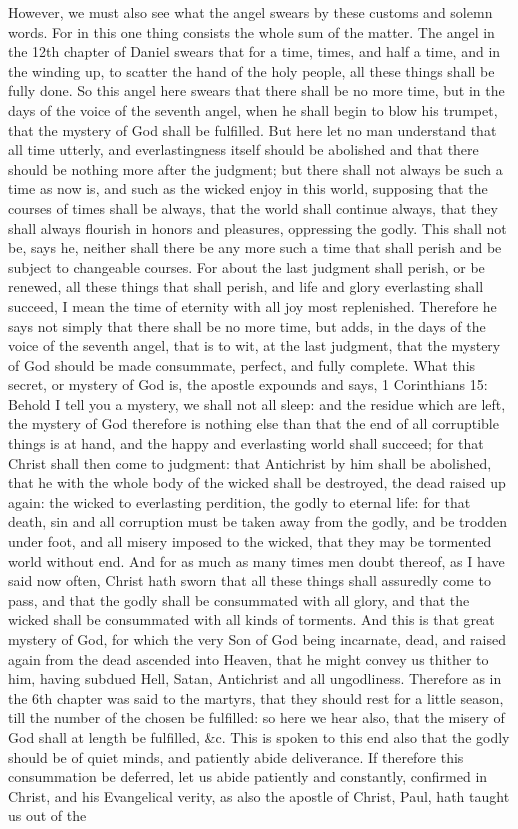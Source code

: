 However, we must also see what the angel swears by these customs and solemn words. For in this one thing consists the whole sum of the matter. The angel in the 12th chapter of Daniel swears that for a time, times, and half a time, and in the winding up, to scatter the hand of the holy people, all these things shall be fully done. So this angel here swears that there shall be no more time, but in the days of the voice of the seventh angel, when he shall begin to blow his trumpet, that the mystery of God shall be fulfilled. But here let no man understand that all time utterly, and everlastingness itself should be abolished and that there should be nothing more after the judgment; but there shall not always be such a time as now is, and such as the wicked enjoy in this world, supposing that the courses of times shall be always, that the world shall continue always, that they shall always flourish in honors and pleasures, oppressing the godly. This shall not be, says he, neither shall there be any more such a time that shall perish and be subject to changeable courses. For about the last judgment shall perish, or be renewed, all these things that shall perish, and life and glory everlasting shall succeed, I mean the time of eternity with all joy most replenished. Therefore he says not simply that there shall be no more time, but adds, in the days of the voice of the seventh angel, that is to wit, at the last judgment, that the mystery of God should be made consummate, perfect, and fully complete. What this secret, or mystery of God is, the apostle expounds and says, 1 Corinthians 15: Behold I tell you a mystery, we shall not all sleep: and the residue which are left, the mystery of God therefore is nothing else than that the end of all corruptible things is at hand, and the happy and everlasting world shall succeed; for that Christ shall then come to judgment: that Antichrist by him shall be abolished, that he with the whole body of the wicked shall be destroyed, the dead raised up again: the wicked to everlasting perdition, the godly to eternal life: for that death, sin and all corruption must be taken away from the godly, and be trodden under foot, and all misery imposed to the wicked, that they may be tormented world without end. And for as much as many times men doubt thereof, as I have said now often, Christ hath sworn that all these things shall assuredly come to pass, and that the godly shall be consummated with all glory, and that the wicked shall be consummated with all kinds of torments. And this is that great mystery of God, for which the very Son of God being incarnate, dead, and raised again from the dead ascended into Heaven, that he might convey us thither to him, having subdued Hell, Satan, Antichrist and all ungodliness. Therefore as in the 6th chapter was said to the martyrs, that they should rest for a little season, till the number of the chosen be fulfilled: so here we hear also, that the misery of God shall at length be fulfilled, \&c. This is spoken to this end also that the godly should be of quiet minds, and patiently abide deliverance. If therefore this consummation be deferred, let us abide patiently and constantly, confirmed in Christ, and his Evangelical verity, as also the apostle of Christ, Paul, hath taught us out of the 